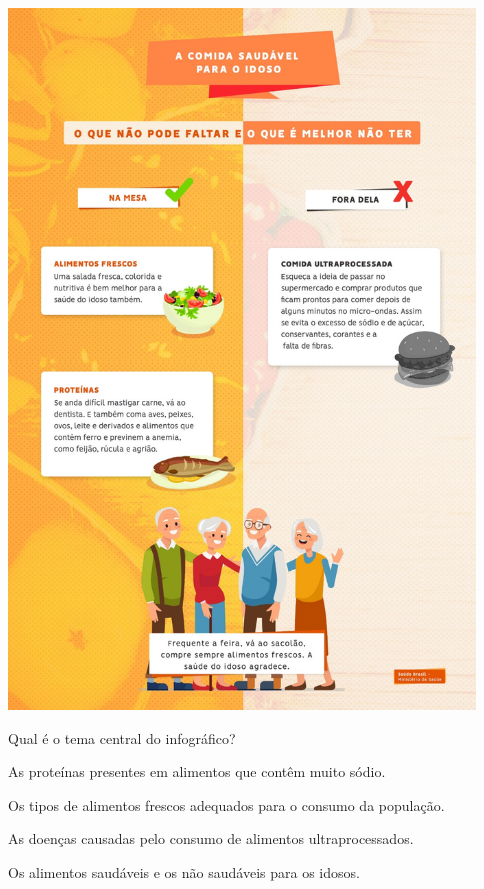 \includegraphics[width=4.87500in,height=7.31250in]{media/image38.jpeg}



Qual é o tema central do infográfico?

\begin{escolha}
\item As proteínas presentes em alimentos que contêm muito sódio.

\item Os tipos de alimentos frescos adequados para o consumo da população.

\item As doenças causadas pelo consumo de alimentos ultraprocessados.

\item Os alimentos saudáveis e os não saudáveis para os idosos.
\end{escolha}

